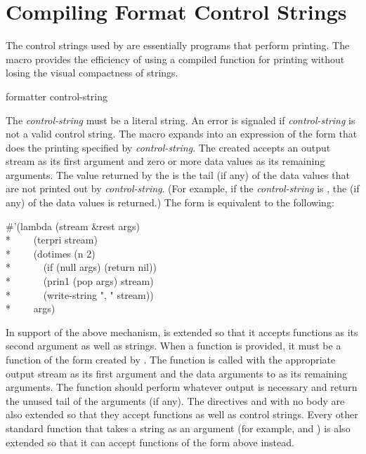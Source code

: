 \section{Compiling Format Control Strings}

The control strings used by  are essentially programs that
perform printing.  The macro  provides the efficiency of
using a compiled function for printing without losing the visual compactness of
 strings.

\begin{defmac}
formatter control-string

The \emph{control-string} must be a literal string.  An error is signaled if
\emph{control-string} is not a valid  control string.  The macro
 expands into an expression of the form
 that does the printing
specified by \emph{control-string}.  The  created accepts an
output stream as its first argument and zero or more data values as its
remaining arguments.  The value returned by the  is the tail (if
any) of the data values that are not printed out by \emph{control-string}.
(For example, if the \emph{control-string} is , the
 (if any) of the data values is returned.)  The form
 is
equivalent to the following:
\begin{lisp}
\#'(lambda (stream \&rest args) \\*
~~~~(terpri stream) \\*
~~~~(dotimes (n 2) \\*
~~~~~~(if (null args) (return nil)) \\*
~~~~~~(prin1 (pop args) stream) \\*
~~~~~~(write-string ", " stream)) \\*
~~~~args)
\end{lisp}

In support of the above mechanism,  is extended so that it accepts
functions as its second argument as well as strings.  When a function is
provided, it must be a function of the form created by .  The
function is called with the appropriate output stream as its first argument
and the data arguments to  as its remaining arguments.  The
function should perform whatever output is necessary and return the unused
tail of the arguments (if any).  The directives  and
\cd{\Xtilde\{\Xtilde\}} with no body are also extended so that they accept
functions as well as control strings.  Every other standard function that
takes a  string as an argument (for example,  and )
is also extended so that it can accept functions of the form above
instead.
\end{defmac}

